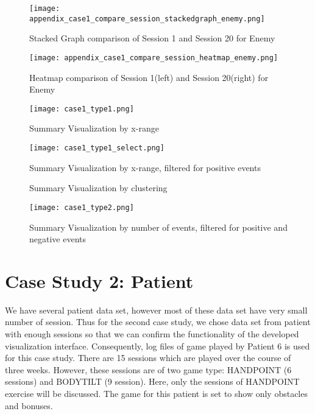 \begin{figure}
\centering
\texttt{[image: appendix\_case1\_compare\_session\_stackedgraph\_enemy.png]}
\caption{Stacked Graph comparison of Session 1 and Session 20 for Enemy}
\label{fig:app1_stacked_enemy}
\end{figure}

\begin{figure}
\centering
\texttt{[image: appendix\_case1\_compare\_session\_heatmap\_enemy.png]}
\caption{Heatmap comparison of Session 1(left) and Session 20(right) for Enemy}
\label{fig:app1_heatmap_enemy}
\end{figure}

\begin{figure}
\centering
\texttt{[image: case1\_type1.png]}
\caption{Summary Visualization by x-range}
\label{fig:case1_type1}
\end{figure}

\begin{figure}
\centering
\texttt{[image: case1\_type1\_select.png]}
\caption{Summary Visualization by x-range, filtered for positive events}
\label{fig:case1_type1_select}
\end{figure}

\begin{figure}%
    \centering
    \qquad
    \caption{Summary Visualization by clustering}%
    \label{fig:case1_clustered}%
\end{figure}

\begin{figure}
\centering
\texttt{[image: case1\_type2.png]}
\caption{Summary Visualization by number of events, filtered for positive and negative events}
\label{fig:case1_type2}
\end{figure}

\section{Case Study 2: Patient}
We have several patient data set, however most of these data set have very small number of session. Thus for the second case study, we chose data set from patient with enough sessions so that we can confirm the functionality of the developed visualization interface. Consequently, log files of game played by Patient 6 is used for this case study. There are 15 sessions which are played over the course of three weeks. However, these sessions are of two game type: HANDPOINT (6 sessions) and BODYTILT (9 session). Here, only the sessions of HANDPOINT exercise will be discussed. The game for this patient is set to show only obstacles and bonuses.


